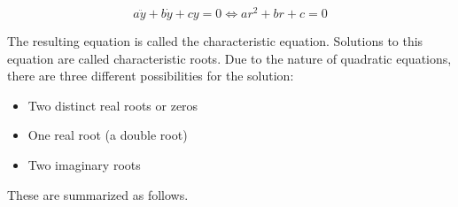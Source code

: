 \documentclass[12pt,landscape,twocolumn]{article}
\begin{document}
        \begin{equation}\label{eq:2de-quad}
            a \ddot{y} + b \dot{y} + cy = 0 \Leftrightarrow ar^2 + br + c = 0
        \end{equation}

    The resulting equation is called the characteristic equation. Solutions to this equation are called characteristic roots. Due to the nature of quadratic equations, there are three different possibilities for the solution:

        \begin{itemize}
            \item Two distinct real roots or zeros
            \item One real root (a double root)
            \item Two imaginary roots
        \end{itemize}

    These are summarized as follows.

        \begin{table}[ht]
            \centering
            \caption{Roots for Second Order Differential Equations in Characteristic Equation Form}
            \label{table:roots}
        \end{table}
\end{document}
